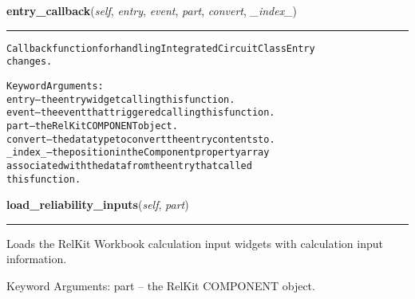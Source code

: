     \label{reliafree:integrated_circuits:ic:IntegratedCircuit:entry_callback}

    \vspace{0.5ex}

\hspace{.8\funcindent}\begin{boxedminipage}{\funcwidth}

    \raggedright \textbf{entry\_callback}(\textit{self}, \textit{entry}, \textit{event}, \textit{part}, \textit{convert}, \textit{\_index\_})

    \vspace{-1.5ex}

    \rule{\textwidth}{0.5\fboxrule}
\setlength{\parskip}{2ex}
\begin{alltt}
Callback function for handling Integrated Circuit Class Entry
changes.

Keyword Arguments:
entry   -- the entry widget calling this function.
event   -- the event that triggered calling this function.
part    -- the RelKit COMPONENT object.
convert -- the data type to convert the entry contents to.
\_index\_ -- the position in the Component property array
           associated with the data from the entry that called
           this function.
\end{alltt}

\setlength{\parskip}{1ex}
    \end{boxedminipage}

    \label{reliafree:integrated_circuits:ic:IntegratedCircuit:load_reliability_inputs}

    \vspace{0.5ex}

\hspace{.8\funcindent}\begin{boxedminipage}{\funcwidth}

    \raggedright \textbf{load\_reliability\_inputs}(\textit{self}, \textit{part})

    \vspace{-1.5ex}

    \rule{\textwidth}{0.5\fboxrule}
\setlength{\parskip}{2ex}
    Loads the RelKit Workbook calculation input widgets with calculation
    input information.

    Keyword Arguments: part -- the RelKit COMPONENT object.

\setlength{\parskip}{1ex}
    \end{boxedminipage}

